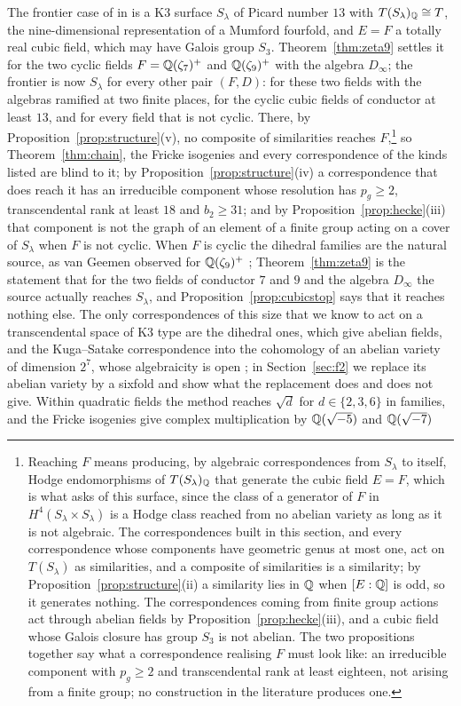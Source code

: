The frontier case of \Fiii{} in \cite[Thm.~21.4 and Rem.~21.5]{BMB26} is a K3 surface $S_{\lambda}$ of Picard number $13$ with $T(S_{\lambda})_{\mathbb{Q}}\cong T$, the nine-dimensional representation of a Mumford fourfold, and $E=F$ a totally real cubic field, which may have Galois group $S_{3}$. Theorem~\ref{thm:zeta9} settles it for the two cyclic fields $F=\mathbb{Q}(\zeta_{7})^{+}$ and $\mathbb{Q}(\zeta_{9})^{+}$ with the algebra $D_{\infty}$; the frontier is now $S_{\lambda}$ for every other pair $(F,D)$: for these two fields with the algebras ramified at two finite places, for the cyclic cubic fields of conductor at least $13$, and for every field that is not cyclic. There, by Proposition~\ref{prop:structure}(v), no composite of similarities reaches $F$,\footnote{Reaching $F$ means producing, by algebraic correspondences from $S_{\lambda}$ to itself, Hodge endomorphisms of $T(S_{\lambda})_{\mathbb{Q}}$ that generate the cubic field $E=F$, which is what \Fiii{} asks of this surface, since the class of a generator of $F$ in $H^{4}(S_{\lambda}\times S_{\lambda})$ is a Hodge class reached from no abelian variety as long as it is not algebraic. The correspondences built in this section, and every correspondence whose components have geometric genus at most one, act on $T(S_{\lambda})$ as similarities, and a composite of similarities is a similarity; by Proposition~\ref{prop:structure}(ii) a similarity lies in $\mathbb{Q}$ when $[E:\mathbb{Q}]$ is odd, so it generates nothing. The correspondences coming from finite group actions act through abelian fields by Proposition~\ref{prop:hecke}(iii), and a cubic field whose Galois closure has group $S_{3}$ is not abelian. The two propositions together say what a correspondence realising $F$ must look like: an irreducible component with $p_{g}\ge2$ and transcendental rank at least eighteen, not arising from a finite group; no construction in the literature produces one.} so Theorem~\ref{thm:chain}, the Fricke isogenies and every correspondence of the kinds listed are blind to it; by Proposition~\ref{prop:structure}(iv) a correspondence that does reach it has an irreducible component whose resolution has $p_{g}\ge2$, transcendental rank at least $18$ and $b_{2}\ge31$; and by Proposition~\ref{prop:hecke}(iii) that component is not the graph of an element of a finite group acting on a cover of $S_{\lambda}$ when $F$ is not cyclic. When $F$ is cyclic the dihedral families are the natural source, as van Geemen observed for $\mathbb{Q}(\zeta_{9})^{+}$ \cite[Rem.~7.9]{vG08}; Theorem~\ref{thm:zeta9} is the statement that for the two fields of conductor $7$ and $9$ and the algebra $D_{\infty}$ the source actually reaches $S_{\lambda}$, and Proposition~\ref{prop:cubicstop} says that it reaches nothing else. The only correspondences of this size that we know to act on a transcendental space of K3 type are the dihedral ones, which give abelian fields, and the Kuga--Satake correspondence into the cohomology of an abelian variety of dimension $2^{7}$, whose algebraicity is open \cite{Del72,vG00}; in Section~\ref{sec:f2} we replace its abelian variety by a sixfold and show what the replacement does and does not give. Within quadratic fields the method reaches $\sqrt d$ for $d\in\{2,3,6\}$ in families, and the Fricke isogenies give complex multiplication by $\mathbb{Q}(\sqrt{-5})$ and $\mathbb{Q}(\sqrt{-7})$ 